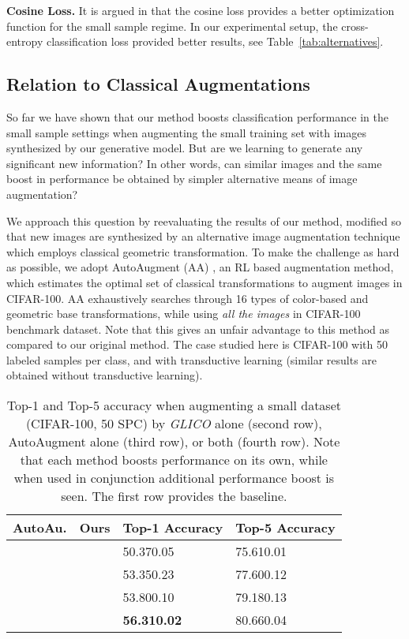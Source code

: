 \documentclass[a4paper,conference]{IEEEtran}
\begin{document}
\textbf{Cosine Loss.} It is argued in \cite{cosinesmalldata} that the cosine loss provides a better optimization function for the small sample regime. In our experimental setup, the cross-entropy classification loss provided better results, see Table~\ref{tab:alternatives}.


\subsection{Relation to Classical Augmentations}
\label{sec: autoaug}
So far we have shown that our method boosts classification performance in the small sample settings when augmenting the small training set with images synthesized by our generative model. But are we learning to generate any significant new information? In other words, can similar images and the same boost in performance be obtained by simpler alternative means of image augmentation? 

We approach this question by reevaluating the results of our method, modified so that new images are synthesized by an alternative image augmentation technique which employs classical geometric transformation. To make the challenge as hard as possible, we adopt AutoAugment (AA) \cite{Cubuk2018AutoAugmentLA}, an RL based augmentation method, which estimates the optimal set of classical transformations to augment images in CIFAR-100. AA exhaustively searches through 16 types of color-based and geometric base transformations, while using \emph{all the images} in CIFAR-100 benchmark dataset. Note that this gives an unfair advantage to this method as compared to our original method. The case studied here is CIFAR-100 with 50 labeled samples per class, and with transductive learning (similar results are obtained without transductive learning).

\begin{table}[htbp]
	\vskip -0.1in
	\centering
	\caption{Top-1 and Top-5 accuracy when augmenting a small dataset (CIFAR-100, 50 SPC) by \textit{GLICO} alone (second row), AutoAugment alone (third row), or both (fourth row). Note that each method boosts performance on its own, while when used in conjunction additional performance boost is seen. The first row provides the baseline.
	}
	\label{tab: autoaugment}
	\begin{tabular}{ccll}
		\toprule
		AutoAu.      & Ours         & Top-1 Accuracy          & Top-5 Accuracy \\
		\midrule
		             &              & 50.370.05          & 75.610.01 \\
		             &  & 53.350.23          & 77.600.12 \\
		 &              & 53.800.10          & 79.180.13 \\
		 &  & \textbf{56.310.02} & 80.660.04 \\
		\bottomrule
	\end{tabular}
	\vskip -0.1in
\end{table}
		
\end{document}

